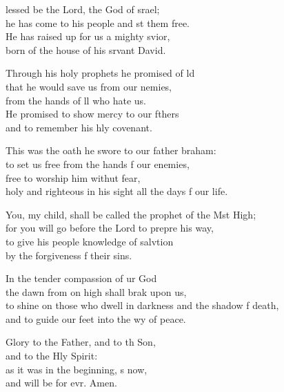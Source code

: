 \settowidth{\versewidth}{to shine on those who dwell in darkness and the shadow of death, *}
\begin{psalmverse}%
  \begin{patverse}
lessed be the Lord, the God of srael;\Med\\
he has come to his people and st them free.\\
He has raised up for us a mighty svior,\Med\\
born of the house of his srvant David.

Through his holy prophets he promised of ld\Flex\\
that he would save us from our nemies,\Med\\
from the hands of ll who hate us.\\
He promised to show mercy to our fthers\Med\\
and to remember his hly covenant.

This was the oath he swore to our father braham:\Med\\
to set us free from the hands f our enemies,\\
free to worship him withut fear,\Med\\
holy and righteous in his sight all the days f our life. 

You, my child, shall be called the prophet of the Mst High;\Med\\
for you will go before the Lord to prepre his way,\\
to give his people knowledge of salvtion\Med\\
by the forgiveness f their sins.

In the tender compassion of ur God\Med\\
the dawn from on high shall brak upon us,\\
to shine on those who dwell in darkness and the shadow f death,\Med\\
and to guide our feet into the wy of peace.

Glory to the Father, and to th Son,\Med\\
and to the Hly Spirit:\\
as it was in the beginning, \pointup{\i}s now,\Med\\
and will be for evr. Amen.
  \end{patverse}
  \end{psalmverse}
